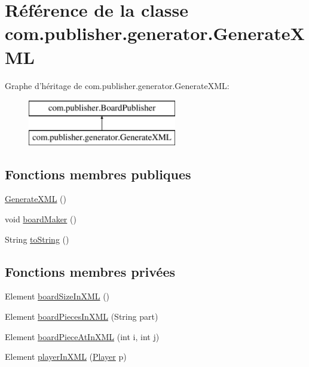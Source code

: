 \hypertarget{classcom_1_1publisher_1_1generator_1_1GenerateXML}{\section{Référence de la classe com.\-publisher.\-generator.\-Generate\-X\-M\-L}
\label{classcom_1_1publisher_1_1generator_1_1GenerateXML}
}
Graphe d'héritage de com.\-publisher.\-generator.\-Generate\-X\-M\-L\-:\begin{figure}[H]
\begin{center}
\leavevmode
\includegraphics[height=2.000000cm]{d0/d88/classcom_1_1publisher_1_1generator_1_1GenerateXML}
\end{center}
\end{figure}
\subsection*{Fonctions membres publiques}
\begin{DoxyCompactItemize}
\item 
\hyperlink{classcom_1_1publisher_1_1generator_1_1GenerateXML_a0207e8c80c3243f24632232302a0b24c}{Generate\-X\-M\-L} ()
\item 
void \hyperlink{classcom_1_1publisher_1_1generator_1_1GenerateXML_a0e0a8453dea04a5f36005f528bcf3d86}{board\-Maker} ()
\item 
String \hyperlink{classcom_1_1publisher_1_1generator_1_1GenerateXML_a79351744ec4dbfd5aecc3a44626727c4}{to\-String} ()
\end{DoxyCompactItemize}
\subsection*{Fonctions membres privées}
\begin{DoxyCompactItemize}
\item 
Element \hyperlink{classcom_1_1publisher_1_1generator_1_1GenerateXML_ae3f30340ab6223aad945f96dfde40db8}{board\-Size\-In\-X\-M\-L} ()
\item 
Element \hyperlink{classcom_1_1publisher_1_1generator_1_1GenerateXML_a3a080523195e34489a684e33984448e8}{board\-Pieces\-In\-X\-M\-L} (String part)
\item 
Element \hyperlink{classcom_1_1publisher_1_1generator_1_1GenerateXML_aecfba9f11b369d214fe3ab1aed529bc5}{board\-Piece\-At\-In\-X\-M\-L} (int i, int j)
\item 
Element \hyperlink{classcom_1_1publisher_1_1generator_1_1GenerateXML_aca0e920a2c2064e744e501bdf66de93b}{player\-In\-X\-M\-L} (\hyperlink{classcom_1_1publisher_1_1Player}{Player} p)
\end{DoxyCompactItemize}
